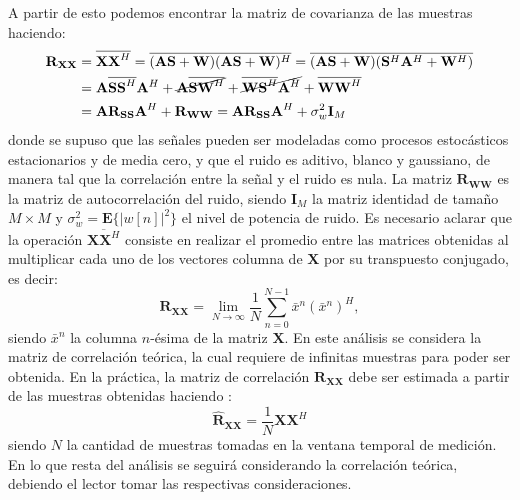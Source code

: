 A partir de esto podemos encontrar la matriz de covarianza de las muestras haciendo:
\begin{align}
    \mathbf{R_{XX}} & =\overline{\mathbf{XX}^H}=\overline{(\mathbf{AS}+\mathbf{W})(\mathbf{AS}+\mathbf{W})^H}=\overline{(\mathbf{AS}+\mathbf{W})(\mathbf{S}^H\mathbf{A}^H+\mathbf{W}^H)}\nonumber      \\
                    & = \mathbf{A}\overline{\mathbf{SS}^H}\mathbf{A}^H + \cancel{\mathbf{A}\overline{\mathbf{SW}^H}}+\cancel{\overline{\mathbf{WS}^H}\mathbf{A}^H} + \overline{\mathbf{WW}^H}\nonumber \\
                    & = \mathbf{AR_{SS}A}^H+\mathbf{R_{WW}}=\mathbf{AR_{SS}A}^H+\sigma^2_w\mathbf{I}_M
    \label{eq:doaest_rxx_teor}
\end{align}
donde se supuso que las señales pueden ser modeladas como procesos estocásticos estacionarios y de media cero, y que el ruido es aditivo, blanco y gaussiano, de manera tal que la correlación entre la señal y el ruido es nula. La matriz $\mathbf{R_{WW}}$ es la matriz de autocorrelación del ruido, siendo $\mathbf{I}_M$ la matriz identidad de tamaño $M\times M$ y $\sigma^2_w=\mathbf{E}\{|w[n]|^2\}$ el nivel de potencia de ruido. Es necesario aclarar que la operación $\overline{\mathbf{XX}^H}$ consiste en realizar el promedio entre las matrices obtenidas al multiplicar cada uno de los vectores columna de $\mathbf{X}$ por su transpuesto conjugado, es decir:
\begin{equation}
    \mathbf{R_{XX}}= \lim_{N\rightarrow\infty} \frac{1}{N} \sum_{n=0}^{N-1}\bar{x}^n(\bar{x}^n)^H,
\end{equation}
siendo $\bar{x}^n$ la columna $n$-ésima de la matriz $\mathbf{X}$. En este análisis se considera la matriz de correlación teórica, la cual requiere de infinitas muestras para poder ser obtenida. En la práctica, la matriz de correlación $\mathbf{R_{XX}}$ debe ser estimada a partir de las muestras obtenidas haciendo \cite{bib:Manolakis_ch9.6}:
\begin{equation}
    \mathbf{\hat{R}_{XX}}=\frac{1}{N} \mathbf{XX}^H
    \label{eq:doaest_rxx_est}
\end{equation}
siendo $N$ la cantidad de muestras tomadas en la ventana temporal de medición. En lo que resta del análisis se seguirá considerando la correlación teórica, debiendo el lector tomar las respectivas consideraciones.

